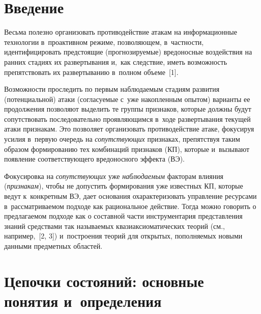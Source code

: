 
  
\vspace*{-6pt}



\thispagestyle{headings}

\begin{multicols}{2}

\label{st\stat}

\section{Введение}

  Весьма полезно организовать противодействие атакам на информационные 
технологии в~проактивном режиме, позволяющем, в~частности, 
идентифицировать предстоящие (прогнозируемые) вредонос\-ные воздействия на 
ранних стадиях их развертывания и,~как следствие, иметь возможность 
препятствовать их развертыванию в~полном объеме~[1].
  
  Возможности проследить по первым наблюда\-емым стадиям развития 
(потенциальной) атаки (согласуемые с~уже накопленным опытом) варианты ее 
продолжения позволяют выделить те группы признаков, которые должны будут 
сопутствовать последовательно проявляющимся в~ходе развертывания текущей 
атаки признакам. Это позволяет организовать противодействие атаке, фокусируя 
усилия в~первую очередь на \textit{сопутствующих} признаках, препятствуя 
таким образом формированию тех комбинаций признаков (КП), которые 
и~вызывают появление соответствующего вредоносного эффекта (ВЭ).
  
  Фокусировка на \textit{сопутствующих} уже \textit{наблюда\-емым} факторам 
влияния (\textit{признакам}), чтобы не допустить формирования уже известных 
КП, которые ведут к~конкретным ВЭ, дает основания охарактеризовать 
управление ресурсами в~рассматриваемом подходе как рациональное действие.
  Тогда можно говорить о предлагаемом подходе как о составной части 
инструментария представления знаний средствами так называемых 
квазиаксиоматических теорий (см., например,~[2, 3]) и~построения теорий для 
открытых, пополняемых новыми данными предметных областей.

\section{Цепочки состояний: основные понятия и~определения}


\end{multicols}
